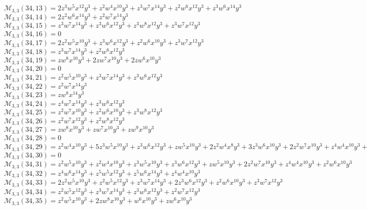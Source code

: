 $\mathcal{M}_{3,3}(34,13)=2z^3w^5x^{12}y^3+z^2w^4x^{10}y^3+z^3w^7x^{14}y^3+z^2w^6x^{12}y^3+z^3w^6x^{14}y^3$\\
$\mathcal{M}_{3,3}(34,14)=2z^2w^6x^{14}y^3+z^2w^7x^{14}y^3$\\
$\mathcal{M}_{3,3}(34,15)=z^3w^7x^{14}y^3+z^3w^6x^{12}y^3+z^3w^8x^{12}y^3+z^3w^7x^{12}y^3$\\
$\mathcal{M}_{3,3}(34,16)=0$\\
$\mathcal{M}_{3,3}(34,17)=2z^2w^5x^{10}y^3+z^3w^6x^{12}y^3+z^2w^6x^{10}y^3+z^3w^7x^{12}y^3$\\
$\mathcal{M}_{3,3}(34,18)=z^3w^7x^{14}y^3+z^2w^6x^{12}y^3$\\
$\mathcal{M}_{3,3}(34,19)=zw^8x^{10}y^3+2zw^7x^{10}y^3+2zw^6x^{10}y^3$\\
$\mathcal{M}_{3,3}(34,20)=0$\\
$\mathcal{M}_{3,3}(34,21)=z^2w^5x^{10}y^3+z^3w^7x^{14}y^3+z^3w^6x^{12}y^3$\\
$\mathcal{M}_{3,3}(34,22)=z^2w^7x^{14}y^3$\\
$\mathcal{M}_{3,3}(34,23)=zw^8x^{14}y^3$\\
$\mathcal{M}_{3,3}(34,24)=z^4w^7x^{14}y^3+z^3w^6x^{12}y^3$\\
$\mathcal{M}_{3,3}(34,25)=z^2w^7x^{10}y^3+z^2w^6x^{10}y^3+z^3w^8x^{12}y^3$\\
$\mathcal{M}_{3,3}(34,26)=z^2w^7x^{12}y^3+z^2w^8x^{12}y^3$\\
$\mathcal{M}_{3,3}(34,27)=zw^8x^{10}y^3+zw^7x^{10}y^3+zw^9x^{10}y^3$\\
$\mathcal{M}_{3,3}(34,28)=0$\\
$\mathcal{M}_{3,3}(34,29)=z^2w^4x^{10}y^3+5z^3w^5x^{10}y^3+z^3w^6x^{12}y^3+zw^5x^{10}y^3+2z^2w^4x^8y^3+3z^3w^6x^{10}y^3+2z^2w^7x^{10}y^3+z^4w^4x^{10}y^3+z^2w^5x^8y^3$\\
$\mathcal{M}_{3,3}(34,30)=0$\\
$\mathcal{M}_{3,3}(34,31)=z^2w^5x^{10}y^3+z^2w^4x^{10}y^3+z^3w^5x^{10}y^3+z^3w^6x^{12}y^3+zw^5x^{10}y^3+2z^2w^7x^{10}y^3+z^4w^4x^{10}y^3+z^2w^6x^{10}y^3$\\
$\mathcal{M}_{3,3}(34,32)=z^4w^6x^{14}y^3+z^5w^5x^{12}y^3+z^5w^6x^{14}y^3+z^4w^4x^{10}y^3$\\
$\mathcal{M}_{3,3}(34,33)=2z^2w^5x^{10}y^3+z^2w^5x^{12}y^3+z^3w^7x^{14}y^3+2z^3w^6x^{12}y^3+z^2w^6x^{10}y^3+z^3w^7x^{12}y^3$\\
$\mathcal{M}_{3,3}(34,34)=z^2w^5x^{12}y^3+z^3w^7x^{14}y^3+z^3w^6x^{12}y^3+z^2w^7x^{12}y^3$\\
$\mathcal{M}_{3,3}(34,35)=z^2w^5x^{10}y^3+2zw^8x^{10}y^3+w^6x^{10}y^3+zw^6x^{10}y^3$\\
